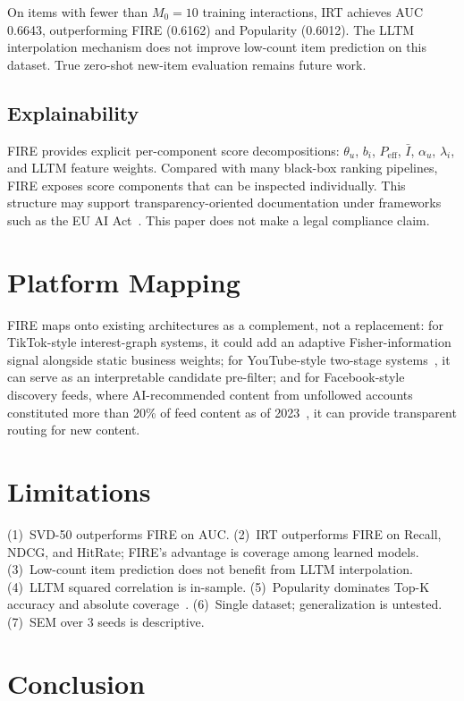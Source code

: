 \documentclass[11pt,a4paper]{article}
\begin{document}
On items with fewer than $M_0 = 10$ training interactions, IRT achieves AUC 0.6643, outperforming FIRE (0.6162) and Popularity (0.6012). The LLTM interpolation mechanism does not improve low-count item prediction on this dataset. True zero-shot new-item evaluation remains future work.

\subsection{Explainability}

FIRE provides explicit per-component score decompositions: $\theta_u$, $b_i$, $P_{\text{eff}}$, $\bar{I}$, $\alpha_u$, $\lambda_i$, and LLTM feature weights. Compared with many black-box ranking pipelines, FIRE exposes score components that can be inspected individually. This structure may support transparency-oriented documentation under frameworks such as the EU AI Act~\citep{euaiact}. This paper does not make a legal compliance claim.

\FloatBarrier
\section{Platform Mapping}

FIRE maps onto existing architectures as a complement, not a replacement: for TikTok-style interest-graph systems, it could add an adaptive Fisher-information signal alongside static business weights; for YouTube-style two-stage systems~\citep{covington2016youtube}, it can serve as an interpretable candidate pre-filter; and for Facebook-style discovery feeds, where AI-recommended content from unfollowed accounts constituted more than 20\% of feed content as of 2023~\citep{meta2023ai}, it can provide transparent routing for new content.

\section{Limitations}

(1)~SVD-50 outperforms FIRE on AUC. (2)~IRT outperforms FIRE on Recall, NDCG, and HitRate; FIRE's advantage is coverage among learned models. (3)~Low-count item prediction does not benefit from LLTM interpolation. (4)~LLTM squared correlation is in-sample. (5)~Popularity dominates Top-K accuracy and absolute coverage~\citep{ji2020popularity}. (6)~Single dataset; generalization is untested. (7)~SEM over 3 seeds is descriptive.

\section{Conclusion}
\end{document}
